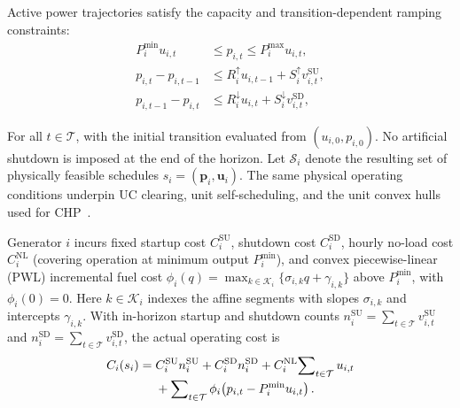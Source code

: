\documentclass[journal]{IEEEtran}
\newcommand{\bp}{\bm p}
\newcommand{\bu}{\bm u}
\newcommand{\Pmin}{P^{\min}}
\newcommand{\Pmax}{P^{\max}}
\newcommand{\Rup}{R^{\uparrow}}
\newcommand{\Rdn}{R^{\downarrow}}
\newcommand{\Sup}{S^{\uparrow}}
\newcommand{\Sdn}{S^{\downarrow}}
\begin{document}
Active power trajectories satisfy the capacity and transition-dependent ramping constraints:
\begin{subequations}\label{eq:physical}
\begin{align}
 \Pmin_i u_{i,t} &\le p_{i,t}\le\Pmax_i u_{i,t},\\
 p_{i,t}-p_{i,t-1} &\le \Rup_i u_{i,t-1} + \Sup_i v_{i,t}^{\mathrm{SU}},\\
 p_{i,t-1}-p_{i,t} &\le \Rdn_i u_{i,t} + \Sdn_i v_{i,t}^{\mathrm{SD}},
\end{align}
\end{subequations}

For all $t\in\mathcal{T}$, with the initial transition evaluated from $(u_{i,0},p_{i,0})$. No artificial shutdown is imposed at the end of the horizon. Let $\mathcal{S}_i$ denote the resulting set of physically feasible schedules $s_i=(\bp_i,\bu_i)$. The same physical operating conditions underpin UC clearing, unit self-scheduling, and the unit convex hulls used for CHP~\cite{zhao2023dependence}.

Generator $i$ incurs fixed startup cost $C_i^{\mathrm{SU}}$, shutdown cost $C_i^{\mathrm{SD}}$, hourly no-load cost $C_i^{\mathrm{NL}}$ (covering operation at minimum output $\Pmin_i$), and convex piecewise-linear (PWL) incremental fuel cost $\phi_i(q)=\max\nolimits_{k\in\mathcal{K}_i}\{\sigma_{i,k}q+\gamma_{i,k}\}$ above $\Pmin_i$, with $\phi_i(0)=0$. Here $k\in\mathcal{K}_i$ indexes the affine segments with slopes $\sigma_{i,k}$ and intercepts $\gamma_{i,k}$. With in-horizon startup and shutdown counts $n_i^{\mathrm{SU}}=\sum\nolimits_{t\in\mathcal{T}}v_{i,t}^{\mathrm{SU}}$ and $n_i^{\mathrm{SD}}=\sum\nolimits_{t\in\mathcal{T}}v_{i,t}^{\mathrm{SD}}$, the actual operating cost is
\begin{align}
C_i(s_i) ={}& C_i^{\mathrm{SU}}n_i^{\mathrm{SU}} + C_i^{\mathrm{SD}}n_i^{\mathrm{SD}}
+ C_i^{\mathrm{NL}}\!\sum\nolimits_{t\in\mathcal{T}}u_{i,t}\notag\\[-2pt]
&+ \sum\nolimits_{t\in\mathcal{T}}\phi_i\!\left(p_{i,t}-\Pmin_i u_{i,t}\right).\label{eq:cost}
\end{align}
\end{document}
